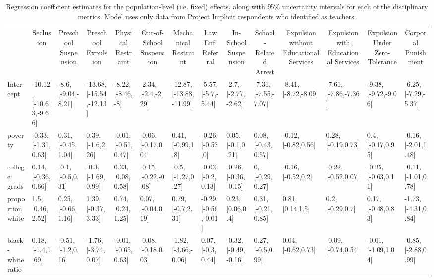 \documentclass[english,floatsintext,man]{apa6}
\makeatletter
\newenvironment{lltable}
  {\begin{landscape}\begin{center}\begin{ThreePartTable}}
  {\end{ThreePartTable}\end{center}\end{landscape}}
\newcommand\LastLTentrywidth{1em}
\newlength\longtablewidth
\newcommand\getlongtablewidth{%
 \begingroup
  \ifcsname LT@\roman{LT@tables}\endcsname
  \global\longtablewidth=0pt
  \renewcommand\LT@entry[2]{\global\advance\longtablewidth by ##2\relax\gdef\LastLTentrywidth{##2}}%
  \@nameuse{LT@\roman{LT@tables}}%
  \fi
\endgroup}
\theoremstyle{definition}
\theoremstyle{definition}
\theoremstyle{remark}
\makeatother
\begin{document}
\begin{lltable}
\small{
\begin{longtable}{llllllllllllll}\noalign{\getlongtablewidth\global\LTcapwidth=\longtablewidth}
\caption{\label{tab:mod-teach}Regression coefficient estimates for the population-level (i.e. fixed) effects, along with 95\% uncertainty intervals for each of the disciplinary metrics. Model uses only data from Project Implicit respondents who identified as teachers.}\\
\toprule
 & \multicolumn{1}{c}{Seclusion} & \multicolumn{1}{c}{Preschool Suspension} & \multicolumn{1}{c}{Preschool Expulsion} & \multicolumn{1}{c}{Physical Restraint} & \multicolumn{1}{c}{Out-of-School Suspension} & \multicolumn{1}{c}{Mechanical Restraint} & \multicolumn{1}{c}{Law Enf. Referral} & \multicolumn{1}{c}{In-School Suspension} & \multicolumn{1}{c}{School-Related Arrest} & \multicolumn{1}{c}{Expulsion without Educational Services} & \multicolumn{1}{c}{Expulsion with Educational Services} & \multicolumn{1}{c}{Expulsion Under Zero-Tolerance} & \multicolumn{1}{c}{Corporal Punishment}\\
\midrule
Intercept & -10.12, [-10.63,-9.66] & -8.6, [-9.04,-8.21] & -13.68, [-15.54,-12.13] & -8.22, [-8.46,-8] & -2.34, [-2.4,-2.29] & -12.87, [-13.88,-11.99] & -5.57, [-5.7,-5.44] & -2.7, [-2.77,-2.62] & -7.31, [-7.55,-7.07] & -8.41, [-8.72,-8.09] & -7.61, [-7.86,-7.36] & -9.38, [-9.72,-9.06] & -6.25, [-7.29,-5.37]\\
poverty & -0.33, [-1.31,0.63] & 0.31, [-0.45,1.04] & 0.39, [-1.6,2.26] & -0.01, [-0.51,0.47] & -0.06, [-0.17,0.04] & 0.41, [-0.99,1.8] & -0.26, [-0.53,0] & 0.05, [-0.1,0.21] & 0.08, [-0.43,0.57] & -0.12, [-0.82,0.56] & 0.28, [-0.19,0.73] & 0.4, [-0.17,0.95] & -0.16, [-2.01,1.48]\\
college grads & 0.14, [-0.36,0.66] & -0.1, [-0.5,0.31] & -0.3, [-1.69,0.99] & 0.33, [0.08,0.58] & -0.15, [-0.22,-0.08] & -0.5, [-1.27,0.27] & -0.03, [-0.2,0.13] & -0.26, [-0.36,-0.15] & 0, [-0.29,0.27] & -0.16, [-0.52,0.2] & -0.22, [-0.52,0.07] & -0.25, [-0.63,0.11] & -0.11, [-1.01,0.78]\\
proportion white & 1.5, [0.46,2.52] & 0.25, [-0.66,1.16] & 1.39, [-0.37,3.33] & 0.74, [0.24,1.25] & 0.07, [-0.04,0.19] & 0.79, [-0.7,2.31] & -0.29, [-0.56,-0.01] & 0.23, [0.06,0.4] & 0.31, [-0.21,0.85] & 0.81, [0.14,1.5] & 0.2, [-0.29,0.7] & 0.17, [-0.48,0.83] & -1.73, [-4.31,0.84]\\
black-white ratio & 0.18, [-1.4,1.69] & -0.51, [-1.2,0.16] & -1.76, [-3.74,0.07] & -0.01, [-0.65,0.63] & -0.08, [-0.18,0.03] & -1.82, [-3.66,-0.06] & 0.07, [-0.3,0.44] & -0.32, [-0.49,-0.16] & 0.27, [-0.5,0.99] & 0.04, [-0.62,0.73] & -0.09, [-0.74,0.54] & -0.01, [-1.09,1.04] & -0.85, [-2.88,0.99]\\

\end{longtable}}
\end{lltable}
\end{document}
